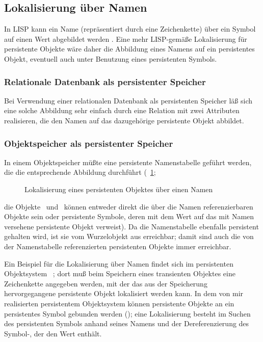 \subsection{Lokalisierung \"{u}ber Namen}
%
In LISP kann ein Name (repr\"{a}sentiert durch eine Zeichenkette) \"{u}ber
ein Symbol auf einen Wert abgebildet werden . Eine mehr
LISP-gem\"{a}\ss{}e Lokalisierung f\"{u}r persistente Objekte w\"{a}re daher
die Abbildung eines Namens auf ein persistentes Objekt, eventuell auch
unter Benutzung eines persistenten Symbols.
%
\subsubsection{Relationale Datenbank als persistenter Speicher}
%
Bei Verwendung einer relationalen Datenbank als persistenten
Speicher l\"{a}\ss{} sich eine solche Abbildung sehr einfach durch eine
Relation mit zwei Attributen realisieren, die den Namen auf das
dazugeh\"{o}rige persistente Objekt abbildet.
%
\subsubsection{Objektspeicher als persistenter Speicher}
%
In einem Objektspeicher m\"{u}\ss{}te eine persistente Namenstabelle
gef\"{u}hrt werden, die die entsprechende Abbildung durchf\"{u}hrt
(\figurename~\ref{fig:adrname}; %
%
\begin{figure}[hbtp]%
\ifbuch%
\centerline{}%
\else%
\centerline{}%
\fi%
\caption{Lokalisierung eines persistenten Objektes \"{u}ber einen Namen}%
\label{fig:adrname}%
\end{figure}%
%
die Objekte \oii\ und \oiii\ k\"{o}nnen entweder direkt die \"{u}ber die
Namen referenzierbaren Objekte sein oder persistente Symbole, deren
\Slt\/ mit dem Wert auf das mit Namen versehene persistente Objekt
verweist). Da die Namenstabelle ebenfalls
persistent gehalten wird, ist sie vom Wurzelobjekt aus erreichbar;
damit sind auch die von der Namenstabelle referenzierten persistenten
Objekte immer erreichbar.
%
\par{}Ein Beispiel f\"{u}r die Lokalisierung \"{u}ber Namen findet sich im
persistenten Objektsystem \zeitgeist\ \cite[]{bib:fo88};
dort mu\ss{} beim Speichern eines transienten Objektes eine Zeichenkette
angegeben werden, mit der das aus der Speicherung hervorgegangene
persistente Objekt lokalisiert werden kann. In dem
von mir realisierten persistentem Objektsystem k\"{o}nnen persistente
Objekte an ein persistentes Symbol gebunden werden
(\citepage{\pageref{sec:psym}}); eine Lokalisierung besteht im Suchen
des persistenten Symbols anhand seines Namens und der Dereferenzierung
des Symbol-\Slt[s], der den Wert enth\"{a}lt.
%
